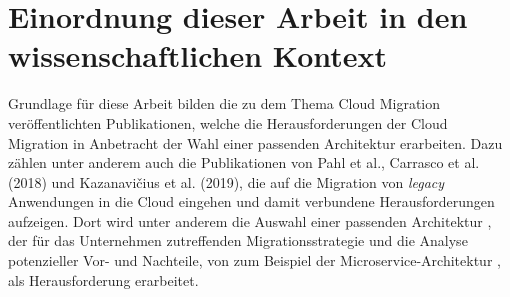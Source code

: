 \section{Einordnung dieser Arbeit in den wissenschaftlichen Kontext}

Grundlage für diese Arbeit bilden die zu dem Thema Cloud Migration veröffentlichten Publikationen, welche die Herausforderungen der Cloud Migration in Anbetracht der Wahl einer passenden Architektur erarbeiten. Dazu zählen unter anderem auch die Publikationen von Pahl et al., Carrasco et al. (2018) und Kazanavičius et al. (2019), die auf die Migration von \textit{legacy} Anwendungen in die Cloud eingehen und damit verbundene Herausforderungen aufzeigen. Dort wird unter anderem die Auswahl einer passenden Architektur \cite[Vgl.][S. 14]{Pahl}, der für das Unternehmen zutreffenden Migrationsstrategie \cite[Vgl.][S. 4]{Kazanavicius2019} und die Analyse potenzieller Vor- und Nachteile, von zum Beispiel der Microservice-Architektur \cite[Vgl.][S. 3]{Carrasco2018}, als Herausforderung erarbeitet.